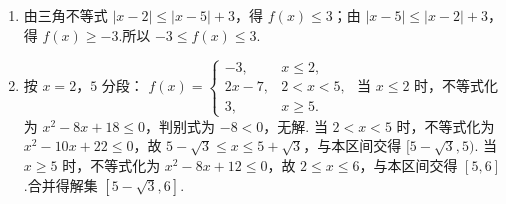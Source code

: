 \begin{solution}
\begin{enumerate}
\item 由三角不等式
\(\displaystyle |x-2|\leq|x-5|+3\)，得 \(f(x)\leq3\)；由
\(\displaystyle |x-5|\leq|x-2|+3\)，得 \(f(x)\geq-3\).所以 \(-3\leq f(x)\leq3\).
\item 按 \(x=2\)，\(5\) 分段：
\(\displaystyle f(x)=\begin{cases}
-3,&x\leq2,\\
2x-7,&2<x<5,\\
3,&x\geq5.
\end{cases}\)
当 \(x\leq2\) 时，不等式化为 \(x^2-8x+18\leq0\)，判别式为 \(-8<0\)，无解.
当 \(2<x<5\) 时，不等式化为 \(x^2-10x+22\leq0\)，故 \(5-\sqrt3\leq x\leq5+\sqrt3\)，与本区间交得 \([5-\sqrt3,5)\).
当 \(x\geq5\) 时，不等式化为 \(x^2-8x+12\leq0\)，故 \(2\leq x\leq6\)，与本区间交得 \([5,6]\).合并得解集 \([5-\sqrt3,6]\).
\end{enumerate}
\end{solution}

